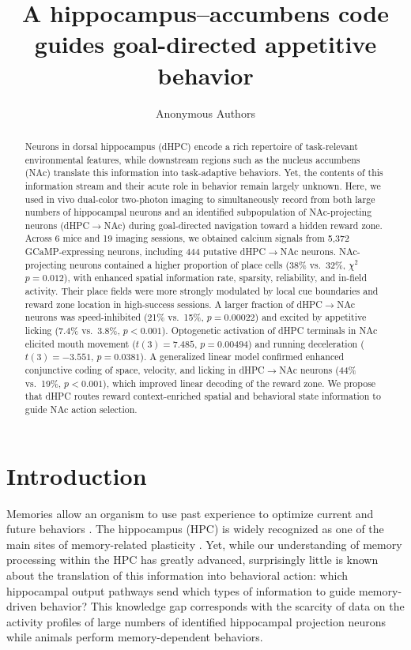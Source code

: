 \documentclass[10pt,a4paper]{article}
\title{A hippocampus--accumbens code guides goal-directed appetitive behavior}
\author[1]{Anonymous Authors}
\affil[1]{Institute for Systems Neuroscience}
\date{}
\begin{document}
\maketitle

\begin{abstract}
Neurons in dorsal hippocampus (dHPC) encode a rich repertoire of task-relevant environmental features, while downstream regions such as the nucleus accumbens (NAc) translate this information into task-adaptive behaviors. Yet, the contents of this information stream and their acute role in behavior remain largely unknown. Here, we used in vivo dual-color two-photon imaging to simultaneously record from both large numbers of hippocampal neurons and an identified subpopulation of NAc-projecting neurons (dHPC$\rightarrow$NAc) during goal-directed navigation toward a hidden reward zone. Across 6 mice and 19 imaging sessions, we obtained calcium signals from 5{,}372 GCaMP-expressing neurons, including 444 putative dHPC$\rightarrow$NAc neurons. NAc-projecting neurons contained a higher proportion of place cells (38\% vs.\ 32\%, $\chi^2$ $p=0.012$), with enhanced spatial information rate, sparsity, reliability, and in-field activity. Their place fields were more strongly modulated by local cue boundaries and reward zone location in high-success sessions. A larger fraction of dHPC$\rightarrow$NAc neurons was speed-inhibited (21\% vs.\ 15\%, $p=0.00022$) and excited by appetitive licking (7.4\% vs.\ 3.8\%, $p<0.001$). Optogenetic activation of dHPC terminals in NAc elicited mouth movement ($t(3)=7.485$, $p=0.00494$) and running deceleration ($t(3)=-3.551$, $p=0.0381$). A generalized linear model confirmed enhanced conjunctive coding of space, velocity, and licking in dHPC$\rightarrow$NAc neurons (44\% vs.\ 19\%, $p<0.001$), which improved linear decoding of the reward zone. We propose that dHPC routes reward context-enriched spatial and behavioral state information to guide NAc action selection.
\end{abstract}

\section{Introduction}
Memories allow an organism to use past experience to optimize current and future behaviors \cite{tolman1948cognitive}. The hippocampus (HPC) is widely recognized as one of the main sites of memory-related plasticity \cite{scoville1957loss,morris1982place,bliss1993synaptic}. Yet, while our understanding of memory processing within the HPC has greatly advanced, surprisingly little is known about the translation of this information into behavioral action: which hippocampal output pathways send which types of information to guide memory-driven behavior? This knowledge gap corresponds with the scarcity of data on the activity profiles of large numbers of identified hippocampal projection neurons while animals perform memory-dependent behaviors.
\end{document}
